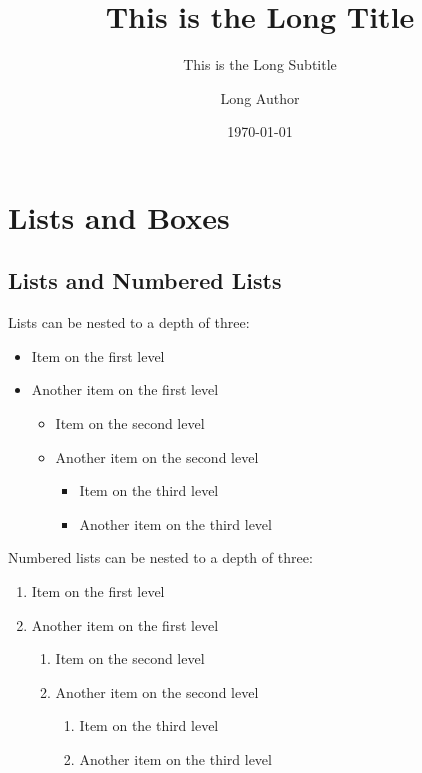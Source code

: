 \documentclass[
	aspectratio=169, %
	8pt, %
]{beamer}
\title[Short Title]{This is the Long Title} %
\subtitle[Short Subtitle]{This is the Long Subtitle} %
\author[Short Author]{Long Author} %
\date{\today} %
\begin{document}
\maketitle %

\section{Lists and Boxes}

\subsection{Lists and Numbered Lists}
\begin{frame}{\insertsubsection}
	\begin{mycolumns}
	    Lists can be nested to a depth of three:
	    \begin{itemize}
	        \item Item on the first level
	    	\item Another item on the first level
	        \begin{itemize}
	            \item Item on the second level
	        	\item Another item on the second level
	            \begin{itemize}
	                \item Item on the third level
	                \item Another item on the third level
	            \end{itemize}
	        \end{itemize}
	    \end{itemize}
    \mynextcolumn
		Numbered lists can be nested to a depth of three:
		\begin{enumerate}
			\item Item on the first level
			\item Another item on the first level
			\begin{enumerate}
				\item Item on the second level
				\item Another item on the second level
				\begin{enumerate}
					\item Item on the third level
					\item Another item on the third level
				\end{enumerate}
			\end{enumerate}
		\end{enumerate}
	\end{mycolumns}
\end{frame}
\end{document}
